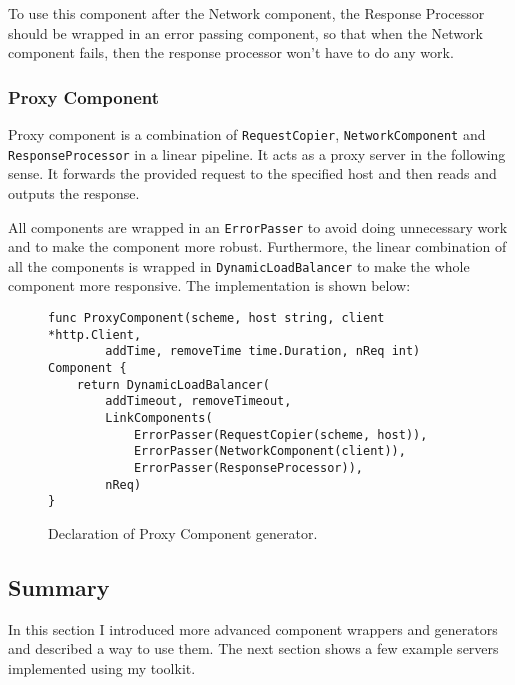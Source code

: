 To use this component after the Network component, the Response Processor
should be wrapped in an error passing component, so that when the 
Network component fails, then the response processor won't have to do
any work.

\subsubsection{Proxy Component}
Proxy component is a combination of \texttt{RequestCopier}, 
\texttt{NetworkComponent} 
and \texttt{ResponseProcessor} in a linear pipeline. It acts as a proxy server
in the following sense. It forwards the provided request to the specified
host and then reads and outputs the response. 

All components are wrapped
in an \texttt{ErrorPasser} to avoid doing unnecessary work and to make the component
more robust. Furthermore, the linear combination of all the components is wrapped in 
\texttt{DynamicLoadBalancer} to make the whole component more 
responsive. The implementation is shown below:

\begin{figure}[h]
\centering
\begin{lstlisting}
func ProxyComponent(scheme, host string, client *http.Client, 
        addTime, removeTime time.Duration, nReq int) Component {
    return DynamicLoadBalancer(
        addTimeout, removeTimeout,
        LinkComponents(
            ErrorPasser(RequestCopier(scheme, host)),
            ErrorPasser(NetworkComponent(client)),
            ErrorPasser(ResponseProcessor)),
        nReq)
}
\end{lstlisting}
\caption[scale=1.0]{Declaration of Proxy Component generator.}
\label{fig:ProxyComp}
\end{figure}
\newpage
\subsection{Summary}
In this section I introduced more advanced component wrappers and generators
and described a way to use them. The next section shows a few example
servers implemented using my toolkit.

